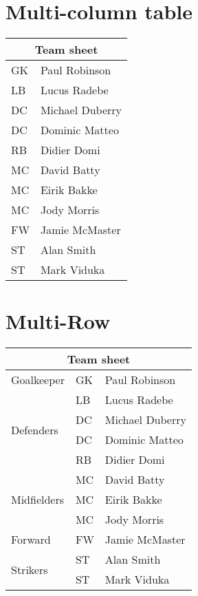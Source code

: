 \documentclass{article}
\begin{document}
\section{Multi-column table}
\begin{table}[h]
\renewcommand{\arraystretch}{1.5}
\begin{tabular}{l l}
  \toprule
  \multicolumn{2}{c}{Team sheet} \\
  \midrule
  GK & Paul Robinson \\
  LB & Lucus Radebe \\
  DC & Michael Duberry \\
  DC & Dominic Matteo \\
  RB & Didier Domi \\
  MC & David Batty \\
  MC & Eirik Bakke \\
  MC & Jody Morris \\
  FW & Jamie McMaster \\
  ST & Alan Smith \\
  ST & Mark Viduka \\
  \bottomrule
\end{tabular}
\end{table}


\section{Multi-Row}
\begin{table}[h]
\begin{tabular}{l l l}
\toprule
\multicolumn{3}{c}{Team sheet} \\
\midrule
Goalkeeper & GK & Paul Robinson \\ \midrule
\multirow{4}{*}{Defenders} & LB & Lucus Radebe \\
 & DC & Michael Duberry \\
 & DC & Dominic Matteo \\
 & RB & Didier Domi \\ \midrule
\multirow{3}{*}{Midfielders} & MC & David Batty \\
 & MC & Eirik Bakke \\
 & MC & Jody Morris \\ \midrule
Forward & FW & Jamie McMaster \\ \midrule
\multirow{2}{*}{Strikers} & ST & Alan Smith \\
 & ST & Mark Viduka \\
\bottomrule
\end{tabular}
\end{table}
\end{document}
